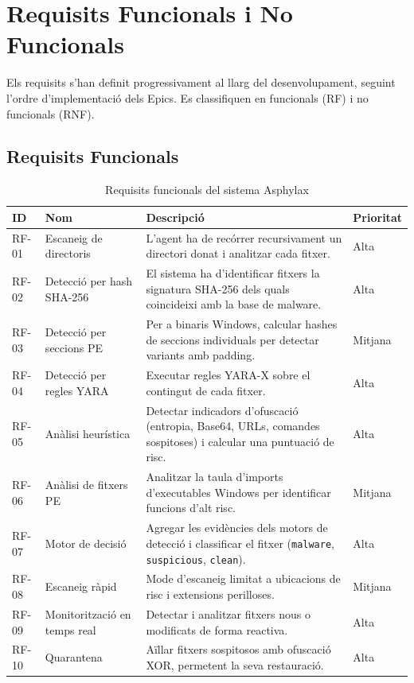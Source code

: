 \documentclass[12pt,a4paper]{report}
\begin{document}
\section{Requisits Funcionals i No Funcionals}
Els requisits s'han definit progressivament al llarg del desenvolupament, seguint l'ordre d'implementació dels Epics. Es classifiquen en funcionals (RF) i no funcionals (RNF).

\subsection{Requisits Funcionals}

\begin{table}[H]
\centering
\caption{Requisits funcionals del sistema Asphylax}
\label{tab:rf}
\begin{tabular}{@{}llp{7.5cm}l@{}}
\toprule
\textbf{ID} & \textbf{Nom} & \textbf{Descripció} & \textbf{Prioritat} \\
\midrule
RF-01 & Escaneig de directoris     & L'agent ha de recórrer recursivament un directori donat i analitzar cada fitxer. & Alta \\
RF-02 & Detecció per hash SHA-256  & El sistema ha d'identificar fitxers la signatura SHA-256 dels quals coincideixi amb la base de malware. & Alta \\
RF-03 & Detecció per seccions PE   & Per a binaris Windows, calcular hashes de seccions individuals per detectar variants amb padding. & Mitjana \\
RF-04 & Detecció per regles YARA   & Executar regles YARA-X sobre el contingut de cada fitxer. & Alta \\
RF-05 & Anàlisi heurística         & Detectar indicadors d'ofuscació (entropia, Base64, URLs, comandes sospitoses) i calcular una puntuació de risc. & Alta \\
RF-06 & Anàlisi de fitxers PE      & Analitzar la taula d'imports d'executables Windows per identificar funcions d'alt risc. & Mitjana \\
RF-07 & Motor de decisió           & Agregar les evidències dels motors de detecció i classificar el fitxer (\texttt{malware}, \texttt{suspicious}, \texttt{clean}). & Alta \\
RF-08 & Escaneig ràpid             & Mode d'escaneig limitat a ubicacions de risc i extensions perilloses. & Mitjana \\
RF-09 & Monitorització en temps real & Detectar i analitzar fitxers nous o modificats de forma reactiva. & Alta \\
RF-10 & Quarantena                 & Aïllar fitxers sospitosos amb ofuscació XOR, permetent la seva restauració. & Alta \\

\end{tabular}
\end{table}
\end{document}
